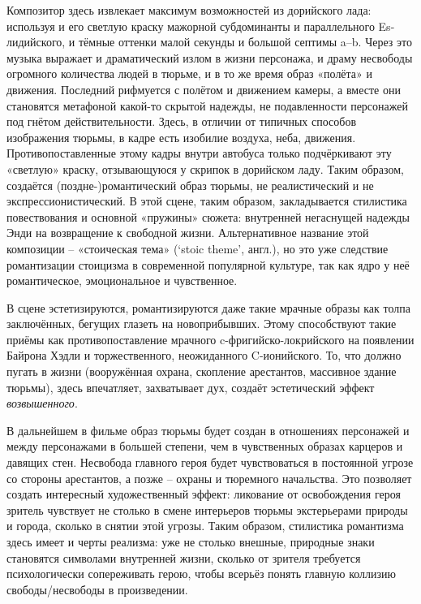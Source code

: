 Композитор здесь извлекает максимум возможностей из дорийского лада: используя и его светлую краску мажорной субдоминанты и параллельного Es-лидийского, и тёмные оттенки малой секунды и большой септимы a--b.
Через это музыка выражает и драматический излом в жизни персонажа, и драму несвободы огромного количества людей в тюрьме, и в то же время образ «полёта» и движения.
Последний рифмуется с полётом и движением камеры, а вместе они становятся метафоной какой-то скрытой надежды, не подавленности персонажей под гнётом действительности.
Здесь, в отличии от типичных способов изображения тюрьмы, в кадре есть изобилие воздуха, неба, движения.
Противопоставленные этому кадры внутри автобуса только подчёркивают эту «светлую» краску, отзывающуюся у скрипок в дорийском ладу.
Таким образом, создаётся (поздне-)романтический образ тюрьмы, не реалистический и не экспрессионистический.
В этой сцене, таким образом, закладывается стилистика повествования и основной «пружины» сюжета: внутренней негаснущей надежды Энди на возвращение к свободной жизни.
Альтернативное название этой композиции -- «стоическая тема» (`stoic theme', англ.), но это уже следствие романтизации стоицизма в современной популярной культуре, так как ядро у неё романтическое, эмоциональное и чувственное.

В сцене эстетизируются, романтизируются даже такие мрачные образы как толпа заключённых, бегущих глазеть на новоприбывших.
Этому способствуют такие приёмы как противопоставление мрачного c-фригийско-локрийского на появлении Байрона Хэдли и торжественного, неожиданного C-ионийского.
То, что должно пугать в жизни (вооружённая охрана, скопление арестантов, массивное здание тюрьмы), здесь впечатляет, захватывает дух, создаёт эстетический эффект \emph{возвышенного}.

В дальнейшем в фильме образ тюрьмы будет создан в отношениях персонажей и между персонажами в большей степени, чем в чувственных образах карцеров и давящих стен.
Несвобода главного героя будет чувствоваться в постоянной угрозе со стороны арестантов, а позже -- охраны и тюремного начальства.
Это позволяет создать интересный художественный эффект: ликование от освобождения героя зритель чувствует не столько в смене интерьеров тюрьмы экстерьерами природы и города, сколько в снятии этой угрозы.
Таким образом, стилистика романтизма здесь имеет и черты реализма: уже не столько внешные, природные знаки становятся символами внутренней жизни, сколько от зрителя требуется психологически сопереживать герою, чтобы всерьёз понять главную коллизию свободы/несвободы в произведении.

